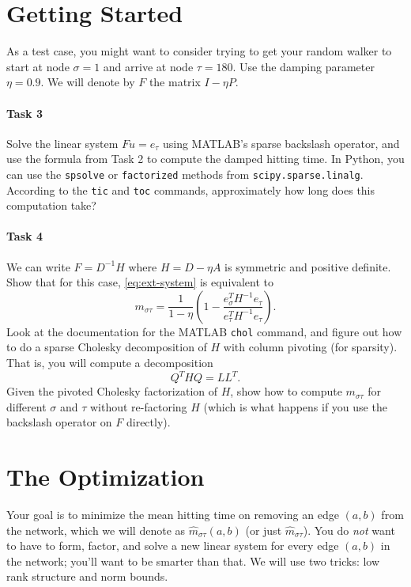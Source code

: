 \documentclass[12pt, leqno]{article}
\begin{document}
\section*{Getting Started}

As a test case, you might want to consider trying to get your random
walker to start at node $\sigma = 1$ and arrive at node $\tau = 180$.
Use the damping parameter $\eta = 0.9$.  We will denote by $F$ the
matrix $I-\eta P$.

\paragraph*{Task 3}
Solve the linear system $F u = e_\tau$ using MATLAB's sparse
backslash operator, and use the formula from Task 2 to compute the
damped hitting time.  In Python, you can use the {\tt spsolve} or
{\tt factorized} methods from {\tt scipy.sparse.linalg}.
According to the {\tt tic} and {\tt toc} commands,
approximately how long does this computation take?

\paragraph*{Task 4}
We can write $F = D^{-1} H$ where $H = D-\eta A$ is symmetric and
positive definite.  Show that for this case,
\eqref{eq:ext-system} is equivalent to
\[
m_{\sigma \tau} =
\frac{1}{1-\eta}
\left(
  1 - \frac{e_{\sigma}^T H^{-1} e_{\tau}}{e_{\tau}^T H^{-1} e_{\tau}}
\right).
\]
Look at the documentation for the MATLAB
{\tt chol} command, and figure out how to do a sparse Cholesky decomposition of
$H$ with column pivoting (for sparsity).  That is, you will compute a
decomposition
\[
  Q^T H Q = LL^T.
\]
Given the pivoted Cholesky factorization of $H$, show how to compute
$m_{\sigma \tau}$ for different $\sigma$ and $\tau$ without
re-factoring $H$ (which is what happens if you use the backslash
operator on $F$ directly).

\section*{The Optimization}

Your goal is to minimize the mean hitting time on removing an edge
$(a,b)$ from the network, which we will denote as
$\hat{m}_{\sigma \tau}(a,b)$ (or just $\hat{m}_{\sigma \tau}$). You do
{\em not} want to have to form, factor, and solve a new linear system
for every edge $(a,b)$ in the network; you'll want to be smarter than
that.  We will use two tricks: low rank structure and norm bounds.
\end{document}
